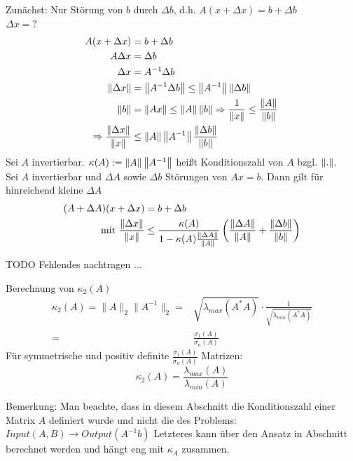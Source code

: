 Zunächst: Nur Störung von $b$ durch $\Delta b$, d.h. $A(x + \Delta x) = b + \Delta b$\\
$\Delta x = ?$
\begin{align*}
  A (x + \Delta x) &= b + \Delta b\\
  A \Delta x &= \Delta b\\
  \Delta x &= A^{-1} \Delta b\\
  \left\lVert \Delta x \right\rVert &= \left\lVert  A^{-1} \Delta b  \right\rVert \leq \left\lVert A^{-1} \right\rVert \left\lVert \Delta b \right\rVert\\
  \left\lVert b \right\rVert &= \left\lVert Ax \right\rVert \leq \left\lVert A \right\rVert\left\lVert b \right\rVert \Rightarrow \frac{1}{\left\lVert x \right\rVert} \leq \frac{\left\lVert A \right\rVert}{\left\lVert b \right\rVert} \\
  \Rightarrow \frac{\left\lVert \Delta x \right\rVert}{\left\lVert x \right\rVert} &\leq \left\lVert A \right\rVert\left\lVert A^{-1} \right\rVert\frac{\left\lVert \Delta b \right\rVert}{\left\lVert b \right\rVert} 
\end{align*}
 Sei $A$ invertierbar. $\kappa(A) := \left\lVert A \right\rVert\left\lVert A^{-1} \right\rVert$ heißt Konditionszahl von $A$ bzgl. $\left\lVert . \right\rVert$.\\
\satz Sei $A$ invertierbar und $\Delta A$ sowie $\Delta b$ Störungen von $Ax=b$.
Dann gilt für hinreichend kleine $\Delta A$
\begin{align*}
  (A+\Delta A)(x + \Delta x) &= b + \Delta b\\
  \text{mit } \frac{\left\lVert \Delta x \right\rVert}{\left\lVert x \right\rVert} &\leq \frac{\kappa(A)}{1-\kappa(A)\frac{\left\lVert \Delta A \right\rVert}{\left\lVert A \right\rVert} } \left( \frac{\left\lVert \Delta A \right\rVert}{\left\lVert A \right\rVert} + \frac{\left\lVert \Delta b \right\rVert}{\left\lVert b \right\rVert} \right)
\end{align*}

TODO Fehlendes nachtragen
...

Berechnung von $\kappa_2\left(A\right)$
\begin{equation*}
  \begin{aligned}
    \kappa_2(A) = \|A\|_2 \|A^{-1}\|_2 = &\sqrt{\lambda_{max}\left(A^*A\right)} \cdot \frac{1}{\sqrt{\lambda_{min}\left(A^*A\right)}} \\
    = &\frac{\sigma_1\left(A\right)}{\sigma_n\left(A\right)}
  \end{aligned}
\end{equation*}
Für symmetrische und positiv definite $\frac{\sigma_1\left(A\right)}{\sigma_n\left(A\right)}$ Matrizen:
\begin{equation*}
  \kappa_2(A) = \frac{\lambda_{max}\left(A\right)}{\lambda_{min}\left(A\right)}
\end{equation*}

Bemerkung: Man beachte, dass in diesem Abschnitt die Konditionszahl einer Matrix $A$ definiert wurde und nicht die des Problems:
$Input\left(A,B\right) \rightarrow Output\left(A^{-1}b\right)$
Letzteres kann über den Ansatz in Abschnitt  berechnet werden und hängt eng mit $\kappa_A$ zusammen.

